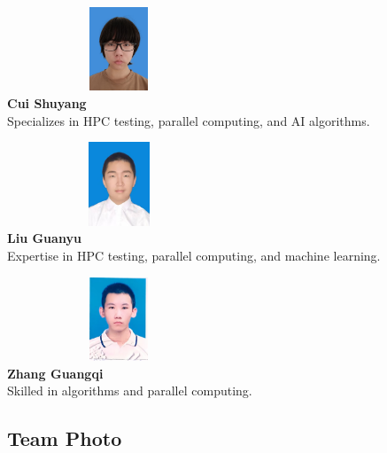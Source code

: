 \documentclass[a4paper,12pt]{article}
\begin{document}
\begin{table}[H]
\begin{center}
\begin{minipage}{0.45\textwidth}
    \centering
    \includegraphics[width=0.5\textwidth, height=2.5cm, keepaspectratio]{Cui_Shuyang.png}\\[0.3cm]
    \textbf{Cui Shuyang}\\[0.3cm]
    \small{Specializes in HPC testing, parallel computing, and AI algorithms.}
\end{minipage}
\begin{minipage}{0.45\textwidth}
    \centering
    \includegraphics[width=0.5\textwidth, height=2.5cm, keepaspectratio]{Liu_Guanyu.jpg}\\[0.3cm]
    \textbf{Liu Guanyu}\\[0.3cm]
    \small{Expertise in HPC testing, parallel computing, and machine learning.}
\end{minipage}

\vspace{1cm}

\begin{minipage}{0.45\textwidth}
    \centering
    \includegraphics[width=0.5\textwidth, height=2.5cm, keepaspectratio]{Zhang_Guangqi.jpg}\\[0.3cm]
    \textbf{Zhang Guangqi}\\[0.3cm]
    \small{Skilled in algorithms and parallel computing.}
\end{minipage}
\end{center}
\end{table}

\subsection{Team Photo}
\end{document}
